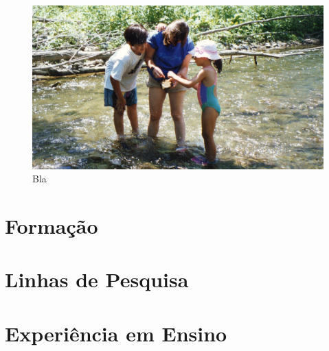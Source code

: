 \documentclass[11pt,a4paper,oneside]{book}
\begin{document}
\begin{figure}[h]
  \vspace{0.5cm}
  \begin{center}
    \includegraphics[width=\textwidth]{images/1997-06-ithaca-creek.jpg}
  \end{center}
  \caption{
    Bla
  }
  \label{fig:example}
\end{figure}


\chapter{Formação}

\chapter{Linhas de Pesquisa}

\chapter{Experiência em Ensino}

\backmatter

\end{document}
